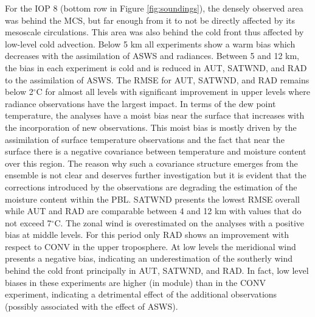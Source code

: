 \documentclass[final,5p,times,twocolumn,authoryear]{elsarticle} %
\begin{document}
For the IOP 8 (bottom row in Figure \ref{fig:soundings}), the densely observed area was behind the MCS, but far enough from it to not be directly affected by its mesoscale circulations. This area was also behind the cold front thus affected by low-level cold advection. Below 5 km all experiments show a warm bias which decreases with the assimilation of ASWS and radiances. Between 5 and 12 km, the bias in each experiment is cold and is reduced in AUT, SATWND, and RAD to the assimilation of ASWS. The RMSE for AUT, SATWND, and RAD remains below 2\(^{\circ}\)C for almost all levels with significant improvement in upper levels where radiance observations have the largest impact. In terms of the dew point temperature, the analyses have a moist bias near the surface that increases with the incorporation of new observations. This moist bias is mostly driven by the assimilation of surface temperature observations and the fact that near the surface there is a negative covariance between temperature and moisture content over this region. The reason why such a covariance structure emerges from the ensemble is not clear and deserves further investigation but it is evident that the corrections introduced by the observations are degrading the estimation of the moisture content within the PBL. SATWND presents the lowest RMSE overall while AUT and RAD are comparable between 4 and 12 km with values that do not exceed 7\(^{\circ}\)C. The zonal wind is overestimated on the analyses with a positive bias at middle levels. For this period only RAD shows an improvement with respect to CONV in the upper troposphere. At low levels the meridional wind presents a negative bias, indicating an underestimation of the southerly wind behind the cold front principally in AUT, SATWND, and RAD. In fact, low level biases in these experiments are higher (in module) than in the CONV experiment, indicating a detrimental effect of the additional observations (possibly associated with the effect of ASWS).
\end{document}
